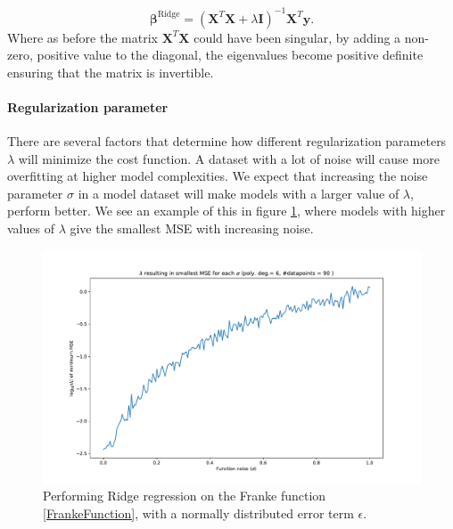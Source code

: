 \documentclass[11pt,a4paper,titlepage]{article}
\begin{document}
\begin{equation*}
    \boldsymbol{\beta}^{\mathrm{Ridge}} = \left(\boldsymbol{X}^T\boldsymbol{X}+\lambda\boldsymbol{I}\right)^{-1}\boldsymbol{X}^T\boldsymbol{y}.
\end{equation*}
Where as before the matrix $\boldsymbol{X}^T\boldsymbol{X}$ could have been singular, by adding a non- zero, positive value to the diagonal, the eigenvalues become positive definite ensuring that the matrix is invertible.
\paragraph*{Regularization parameter}
There are several factors that determine how different regularization parameters $\lambda$ will minimize the cost function. A dataset with a lot of noise will cause more overfitting at higher model complexities. We expect that increasing the noise parameter $\sigma$ in a model dataset will make models with a larger value of $\lambda$, perform better. We see an example of this in figure \ref{lambdatonoise}, where models with higher values of $\lambda$ give the smallest MSE with increasing noise.
\begin{figure}[H]
\centering

\includegraphics[trim=2cm 1.0cm 2cm 1.4cm, clip=true,scale = 0.5]{Smallest_MSE_lambda_over_noise.pdf}
\caption[Optimal regularization parameter to noise]{Performing Ridge regression on the Franke function \eqref{FrankeFunction}, with a normally distributed error term $\epsilon$.}\label{lambdatonoise}
\end{figure}
\end{document}
